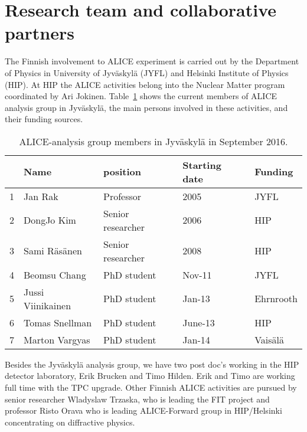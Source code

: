 
\section{Research team and collaborative partners} %
\label{sec:reseachteam}

The Finnish involvement to ALICE experiment is carried out by the Department of Physics in University of Jyv\"askyl\"a (JYFL) and Helsinki Institute of Physics (HIP). At HIP the ALICE activities belong into the Nuclear Matter program coordinated by Ari Jokinen. Table~\ref{tab:personnel} shows the current members of ALICE analysis group in Jyv\"askyl\"a, the main persons involved in these activities, and their funding sources.

\begin{table}[htp]
\caption{ALICE-analysis group members in Jyv\"askyl\"a in September 2016.}
\begin{center}
\begin{tabular}{|l|l|l|l|l|}
\hline
   &  Name                       &  position         & Starting date & Funding \\
\hline
1 &    Jan  Rak                  & Professor       &  2005           & JYFL \\
2 &    DongJo   Kim          & Senior researcher     &  2006           & HIP \\
3 &    Sami   R\"as\"anen & Senior researcher     &  2008           & HIP \\
 \hline
4 &    Beomsu   Chang     & PhD student   &  Nov-11       & JYFL \\
5 &    Jussi   Viinikainen   & PhD student   & Jan-13         &  Ehrnrooth   \\
6 &    Tomas Snellman     & PhD student   & June-13       & HIP\\
7 &    Marton Vargyas      & PhD student   & Jan-14         & Vais\"al\"a\\
\hline
\end{tabular}
\end{center}
\label{tab:personnel}
\end{table}%

Besides the Jyv\"askyl\"a analysis group, we have two post doc's working in the HIP detector laboratory, Erik Brucken and Timo Hilden. Erik and Timo are working full time with the TPC upgrade. Other Finnish ALICE activities are pursued by senior researcher Wladyslaw Trzaska, who is leading the FIT project and professor Risto Orava who is leading ALICE-Forward group in HIP/Helsinki concentrating on diffractive physics.

